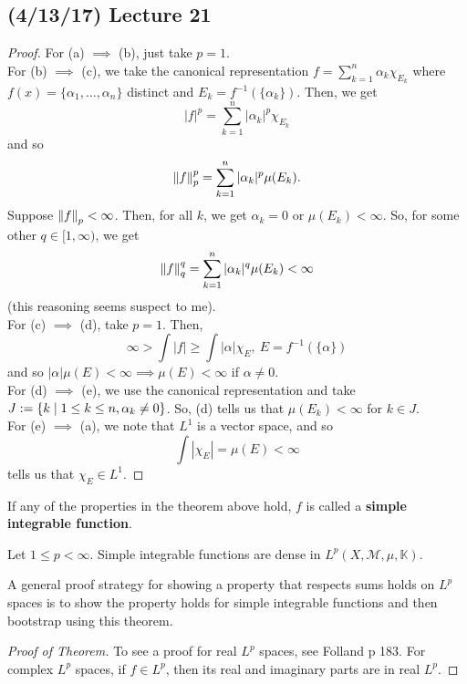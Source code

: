 \documentclass[11pt,leqno,oneside]{amsbook}
\numberwithin{thm}{section}
\newcommand{\M}{\mathcal{M}} %
\newcommand{\K}{\mathbb{K}} %
\renewcommand{\de}{\textbf} %
\begin{document}
\subsection*{(4/13/17) Lecture 21}
\begin{proof}
  For (a) \(\implies\) (b), just take \(p=1\).\\

  For (b) \(\implies\) (c), we take the canonical representation \(f =
  \sum_{k=1}^n \alpha_k \chi_{E_k}\) where \(f(x) = \{\alpha_1,
  \ldots, \alpha_n\}\) distinct and \(E_k =
  f^{-1}(\{\alpha_k\})\). Then, we get \[
    |f|^p = \sum_{k=1}^n |\alpha_k|^p \chi_{E_k}
  \]
  and so \[
    \norm[f]_p^p = \sum_{k=1}^n |\alpha_k|^p \mu(E_k).
  \]
  Suppose \(\norm[f]_p < \infty\). Then, for all \(k\), we get
  \(\alpha_k = 0\) or \(\mu(E_k) < \infty\). So, for some other \(q
  \in [1,\infty)\), we get \[
    \norm[f]_q^q = \sum_{k=1}^n |\alpha_k|^q \mu(E_k) < \infty
  \]
  (this reasoning seems suspect to me). \\

  For (c) \(\implies\) (d), take \(p=1\). Then, \[
    \infty > \int |f| \geq \int |\alpha| \chi_E, \ E = f^{-1}(\{\alpha\})
  \]
  and so \(|\alpha|\mu(E) < \infty \implies \mu(E) < \infty\) if
  \(\alpha \neq 0\). \\

  For (d) \(\implies\) (e), we use the canonical representation and
  take \(J := \{k \st 1 \leq k \leq n, \alpha_k \neq 0\}\). So, (d)
  tells us that \(\mu(E_k) < \infty\) for \(k \in J\).\\

  For (e) \(\implies\) (a), we note that \(L^1\) is a vector space,
  and so \[
    \int |\chi_E| = \mu(E) < \infty
  \]
  tells us that \(\chi_E \in L^1\).
\end{proof}
\begin{defn}
  If any of the properties in the theorem above hold, \(f\) is called
  a \de{simple integrable function}.
\end{defn}
\begin{thm}
  Let \(1 \leq p < \infty\). Simple integrable functions are dense in \(L^p(X,\M,\mu,\K)\).
\end{thm}
\begin{rmk}
  A general proof strategy for showing a property that respects sums
  holds on \(L^p\) spaces is to show the property holds for simple
  integrable functions and then bootstrap using this theorem.
\end{rmk}
\begin{proof}[Proof of Theorem]
  To see a proof for real \(L^p\) spaces, see Folland p 183. For
  complex \(L^p\) spaces, if \(f \in L^p\), then its real and
  imaginary parts are in real \(L^p\).
\end{proof}
\end{document}

